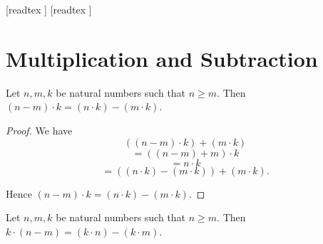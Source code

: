 \documentclass[10pt]{article}
\begin{document}
  \begin{imports}
    \begin{forthel}
      [readtex ]
      [readtex ]
    \end{forthel}
  \end{imports}


  \section*{Multiplication and Subtraction}

  \begin{forthel}
    \begin{proposition}
      Let $n, m, k$ be natural numbers such that $n \geq m$.
      Then $(n - m) \cdot k = (n \cdot k) - (m \cdot k)$.
    \end{proposition}
    \begin{proof}
      We have
      \[  ((n - m) \cdot k) + (m \cdot k)                 \]
      \[    = ((n - m) + m) \cdot k                       \]
      \[    = n \cdot k                                   \]
      \[    = ((n \cdot k) - (m \cdot k)) + (m \cdot k).  \]

      Hence $(n - m) \cdot k = (n \cdot k) - (m \cdot k)$.
    \end{proof}
  \end{forthel}

  \begin{forthel}
    \begin{corollary}
      Let $n, m, k$ be natural numbers such that $n \geq m$.
      Then $k \cdot (n - m) = (k \cdot n) - (k \cdot m)$.
    \end{corollary}
  \end{forthel}
\end{document}
